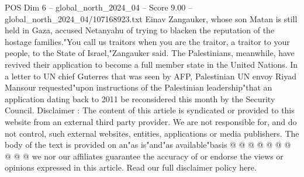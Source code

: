 \begin{textsample}{POS Dim 6 – global\_north\_2024\_04 – Score 9.00 – global\_north\_2024\_04/107168923.txt}
Einav Zangauker, whose son Matan is still held in Gaza, accused Netanyahu of trying to blacken the reputation of the hostage families."You call us traitors when you are the traitor, a traitor to your people, to the State of Israel,"Zangauker said.
The Palestinians, meanwhile, have revived their application to become a full member state in the United Nations.
In a letter to UN chief Guterres that was seen by AFP, Palestinian UN envoy Riyad Mansour requested"upon instructions of the Palestinian leadership"that an application dating back to 2011 be reconsidered this month by the Security Council.
Disclaimer : The content of this article is syndicated or provided to this website from an external third party provider.
We are not responsible for, and do not control, such external websites, entities, applications or media publishers.
The body of the text is provided on an"as is"and"as available"basis @ @ @ @ @ @ @ @ @ @ we nor our affiliates guarantee the accuracy of or endorse the views or opinions expressed in this article.
Read our full disclaimer policy here.

\end{textsample}
